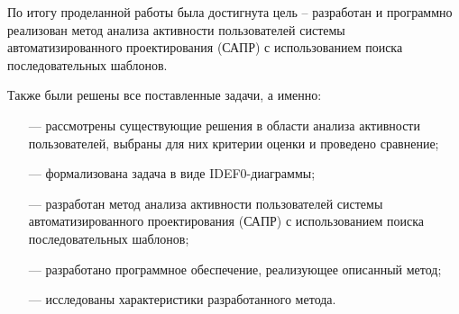 По итогу проделанной работы была достигнута цель -- разработан и программно реализован метод анализа активности пользователей системы автоматизированного проектирования (САПР) с использованием поиска последовательных шаблонов.

Также были решены все поставленные задачи, а именно:

\begin{itemize}
	\item[---] рассмотрены существующие решения в области анализа активности пользователей, выбраны для них критерии оценки и проведено сравнение;
	\item[---] формализована задача в виде IDEF0-диаграммы;
	\item[---] разработан метод анализа активности пользователей системы автоматизированного проектирования (САПР) с использованием поиска последовательных шаблонов; %
	\item[---] разработано программное обеспечение, реализующее описанный метод;
	\item[---] исследованы характеристики разработанного метода.
\end{itemize}